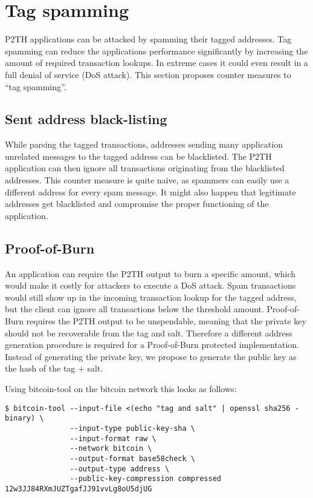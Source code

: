 \documentclass[a4paper,10pt]{article}
\begin{document}
\section{Tag spamming}
P2TH applications can be attacked by spamming their tagged addresses.
Tag spamming can reduce the applications performance significantly by increasing the amount of required transaction lookups.
In extreme cases it could even result in a full denial of service (DoS attack).
This section proposes counter measures to ``tag spamming''.

\subsection{Sent address black-listing}
While parsing the tagged transactions, addresses sending many application unrelated messages to the tagged address can be blacklisted.
The P2TH application can then ignore all transactions originating from the blacklisted addresses.
This counter measure is quite naive, as spammers can easily use a different address for every spam message.
It might also happen that legitimate addresses get blacklisted and compromise the proper functioning of the application.

\subsection{Proof-of-Burn}
An application can require the P2TH output to burn a specific amount,
which would make it costly for attackers to execute a DoS attack.
Spam transactions would still show up in the incoming transaction lookup for the tagged address,
but the client can ignore all transactions below the threshold amount.
Proof-of-Burn requires the P2TH output to be unspendable, meaning that the private key should not be recoverable from the tag and salt.
Therefore a different address generation procedure is required for a Proof-of-Burn protected implementation.
Instead of generating the private key, we propose to generate the public key as the hash of the tag + salt.

Using bitcoin-tool on the bitcoin network this looks as follows:

\begin{scriptsize}\begin{verbatim}
$ bitcoin-tool --input-file <(echo "tag and salt" | openssl sha256 -binary) \
               --input-type public-key-sha \
               --input-format raw \
               --network bitcoin \
               --output-format base58check \
               --output-type address \
               --public-key-compression compressed
12w3JJ84RXmJUZTgafJJ91vvLg8oU5djUG
\end{verbatim}\end{scriptsize}
\end{document}
